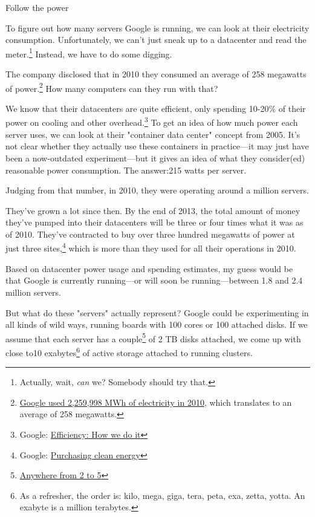 {{Follow the power}

{To figure out how many servers Google is running, we can look at their electricity consumption. Unfortunately, we can't just sneak up to a datacenter and read the meter.{\footnote{Actually, wait, \emph{can} we? Somebody should try that.} } Instead, we have to do some digging.}

{The company disclosed that in 2010 they consumed an average of 258 megawatts of power.{\footnote{ \href{http://www.environmentalleader.com/2011/09/09/google-reveals-electricity-use-breaking-its-silence/}{Google used 2,259,998 MWh of electricity in 2010}, which translates to an average of 258 megawatts.} } How many computers can they run with that?}

{We know that their datacenters are quite efficient, only spending 10-20\% of their power on cooling and other overhead.{\footnote{Google: \href{http://www.google.com/about/datacenters/efficiency/internal/}{Efficiency: How we do it}} } To get an idea of how much power each server uses, we can look at their "container data center" concept from 2005. It's not clear whether they actually use these containers in practice—it may just have been a now-outdated experiment—but it gives an idea of what they consider(ed) reasonable power consumption. The answer:215 watts per server.}

{Judging from that number, in 2010, they were operating around a million servers.}

{They've grown a lot since then. By the end of 2013, the total amount of money they've pumped into their datacenters will be three or four times what it was as of 2010. They've contracted to buy over three hundred megawatts of power at just three sites,{\footnote{Google: \href{http://www.google.com/green/energy/use/\#purchasing}{Purchasing clean energy}} } which is more than they used for all their operations in 2010.}

{Based on datacenter power usage and spending estimates, my guess would be that Google is currently running—or will soon be running—between 1.8 and 2.4 million servers.}

{But what do these "servers" actually represent? Google could be experimenting in all kinds of wild ways, running boards with 100 cores or 100 attached disks. If we assume that each server has a couple{\footnote{ \href{http://xkcd.com/1070/}{Anywhere from 2 to 5}} } of 2 TB disks attached, we come up with close to10 exabytes{\footnote{As a refresher, the order is: kilo, mega, giga, tera, peta, exa, zetta, yotta. An exabyte is a million terabytes.} } of active storage attached to running clusters.}

}
